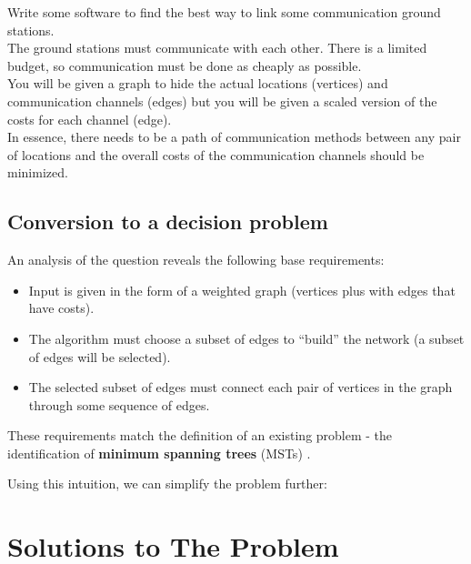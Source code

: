 \documentclass{article}
\begin{document}
\begin{question}
	Write some software to find the best way to link some communication ground stations. \\
	The ground stations must communicate with each other. There is a limited budget, so communication must be done as cheaply as possible. \\
	You will be given a graph to hide the actual locations (vertices) and communication channels (edges) but you will be given a scaled version of the costs for each channel (edge). \\
	In essence, there needs to be a path of communication methods between any pair of locations and the overall costs of the communication channels should be minimized. \\
\end{question}

\subsection{Conversion to a decision problem}

An analysis of the question reveals the following base requirements:

\begin{itemize}
	\item Input is given in the form of a weighted graph (vertices plus with edges that have costs).
	\item The algorithm must choose a subset of edges to “build” the network (a subset of edges will be selected).
	\item The selected subset of edges must connect each pair of vertices in the graph through some sequence of edges.
\end{itemize}

These requirements match the definition of an existing problem - the identification of \textbf{minimum spanning trees} (MSTs) \cite{sedgewick_minimum_2018}.

Using this intuition, we can simplify the problem further:


\section{Solutions to The Problem}
\end{document}
